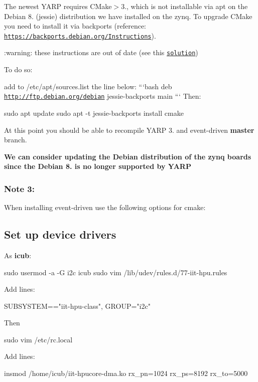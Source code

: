 The newest Y\+A\+RP requires C\+Make$>$3., which is not installable via {\ttfamily apt} on the Debian 8. (jessie) distribution we have installed on the zynq. To upgrade C\+Make you need to install it via backports (reference\+: \href{https://backports.debian.org/Instructions}{\tt https\+://backports.\+debian.\+org/\+Instructions}).

\+:warning\+: these instructions are out of date (see this \href{https://unix.stackexchange.com/questions/508724/failed-to-fetch-jessie-backports-repository}{\tt solution})

To do so\+:
\begin{DoxyItemize}
\item add to {\ttfamily /etc/apt/sources.list} the line below\+: ```bash deb \href{http://ftp.debian.org/debian}{\tt http\+://ftp.\+debian.\+org/debian} jessie-\/backports main ``` Then\+: 
\begin{DoxyCode}
sudo apt update
sudo apt -t jessie-backports install cmake
\end{DoxyCode}
 At this point you should be able to recompile Y\+A\+RP 3. and {\ttfamily event-\/driven} {\bfseries master} branch.
\end{DoxyItemize}

{\bfseries We can consider updating the Debian distribution of the zynq boards since the Debian 8. is no longer supported by Y\+A\+RP}

\subsubsection*{Note 3\+:}

When installing {\ttfamily event-\/driven} use the following options for cmake\+: 
 \subsection*{Set up device drivers}

As {\bfseries icub}\+: 
\begin{DoxyCode}
sudo usermod -a -G i2c icub
sudo vim /lib/udev/rules.d/77-iit-hpu.rules
\end{DoxyCode}
 Add lines\+: 
\begin{DoxyCode}
SUBSYSTEM=="iit-hpu-class", GROUP="i2c"
\end{DoxyCode}
 Then 
\begin{DoxyCode}
sudo vim /etc/rc.local
\end{DoxyCode}
 Add lines\+: 
\begin{DoxyCode}
insmod /home/icub/iit-hpucore-dma.ko rx\_pn=1024 rx\_ps=8192 rx\_to=5000
\end{DoxyCode}
